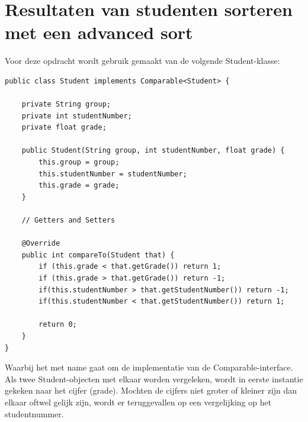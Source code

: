 \documentclass[12pt,notitlepage]{article}
\begin{document}
\renewcommand{\contentsname}{Inhoudsopgave}
\tableofcontents
\clearpage


\section{Resultaten van studenten sorteren met een advanced sort}
Voor deze opdracht wordt gebruik gemaakt van de volgende Student-klasse:

\begin{lstlisting}
public class Student implements Comparable<Student> {

    private String group;
    private int studentNumber;
    private float grade;

    public Student(String group, int studentNumber, float grade) {
        this.group = group;
        this.studentNumber = studentNumber;
        this.grade = grade;
    }
    
    // Getters and Setters
    
    @Override
    public int compareTo(Student that) {
        if (this.grade < that.getGrade()) return 1;
        if (this.grade > that.getGrade()) return -1;
        if(this.studentNumber > that.getStudentNumber()) return -1;
        if(this.studentNumber < that.getStudentNumber()) return 1;

        return 0;
    }
}
\end{lstlisting}

Waarbij het met name gaat om de implementatie van de Comparable-interface. Als twee Student-objecten met elkaar worden vergeleken, wordt in eerste instantie gekeken naar het cijfer (grade). Mochten de cijfers niet groter of kleiner zijn dan elkaar oftwel gelijk zijn, wordt er teruggevallen op een vergelijking op het studentnummer.

\clearpage
\end{document}
